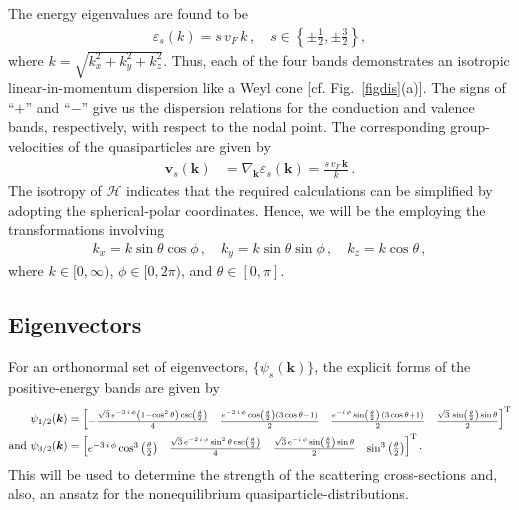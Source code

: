 \documentclass[aps,prb,onecolumn,nofootinbib,citeautoscript,10pt, showkeys]{revtex4-2}
\def \nn{\nonumber \\}
\begin{document}
The energy eigenvalues are found to be
\begin{align}
\label{eqeval}
\varepsilon_s ( k ) =  s \, v_F \, k \,, \quad 
s \in  \left \lbrace  \pm \frac{1}{2}, \pm \frac{3}{2} \right \rbrace,
\end{align}
where $ k = \sqrt{k_x^2 + k_y^2 + k_z^2 } $.
Thus, each of the four bands demonstrates an isotropic linear-in-momentum dispersion  like a Weyl cone [cf. Fig.~\ref{figdis}(a)]. The signs of ``$+$'' and ``$-$'' give us the dispersion relations for the conduction and valence bands, respectively, with respect to the nodal point. The corresponding group-velocities of the quasiparticles are given by 
\begin{align} 
\boldsymbol{v}_{s}(\boldsymbol{k}) &= 
\nabla_{\boldsymbol{k}}  \varepsilon_{s}(\boldsymbol{k})  
=  \frac{ s \, v_F \,\boldsymbol k }{k} \, .  
\end{align}
The isotropy of $\mathcal H $ indicates that the required calculations can be simplified by adopting the spherical-polar coordinates. Hence, we will be the employing the transformations involving
\begin{align}
\label{eqcyln} 
k_x =  k \sin \theta  \cos \phi \,, \quad
k_y =   k \sin \theta  \sin \phi \,, \quad k_z = k \cos \theta\,,
\end{align}
where $ k \in [0, \infty )$, $\phi \in [0, 2 \pi )$, and $\theta \in [0, \pi ]$. 

\subsection{Eigenvectors}

For an orthonormal set of eigenvectors, $ \lbrace \psi_{s} (\boldsymbol k) \rbrace $, the explicit forms of the positive-energy bands are given by
\begin{align}
\label{eqev}
 \psi_{1/2} (\boldsymbol k) & =\begin{bmatrix}
-\frac{\sqrt{3}\, e^{-3 \,i\, \phi }  
\left(1-\cos^2 \theta \right) 
 \csc \left(\frac{\theta }{2}\right)} {4}  &
\frac{e^{-2 \,i \,\phi } \cos \left(\frac{\theta }{2}\right) (3 \cos  \theta  -1)}{2}&
   \frac{ e^{-i \,\phi }  \sin \left(\frac{\theta
   }{2}\right) \,(3 \cos  \theta  + 1)}{2}   &
   \frac{\sqrt{3} \, \sin \left(\frac{\theta }{2}\right) \sin  \theta  }  {2}  
\end{bmatrix}^{\rm T} 
\nn   \text{and }
\psi_{3/2} (\boldsymbol k) & = \begin{bmatrix}
e^{-3 \,i \,\phi } \cos^3\left(\frac{\theta }{2}\right) &
\frac{ \sqrt{3} \,e^{-2\, i \,\phi }
\sin^2 \theta  \csc \left(\frac{\theta }{2}\right)}{4}   &
   \frac{ \sqrt{3} \,e^{-i\, \phi } \sin \left(\frac{\theta }{2}\right) \sin  \theta}{2}   &
\sin^3\left(\frac{\theta }{2}\right)
\end{bmatrix}^{\rm T} .
\end{align} 
This will be used to determine the strength of the scattering cross-sections and, also, an ansatz for the nonequilibrium quasiparticle-distributions.
\end{document}
